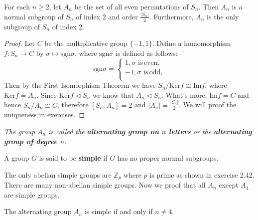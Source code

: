 \begin{theorem}
For each $n\ge 2$, let $A_n$ be the set of all even permutations of $S_n$. Then $A_n$ is a normal subgroup of $S_n$ of index $2$ and order $\frac{|S_n|}{2}$. Furthermore, $A_n$ is the only subgroup of $S_n$ of index $2$.
\end{theorem}
\begin{proof}
Let $C$ be the multiplicative group $\{-1,1\}$. Define a homomorphism $f:S_n\to C$ by $\sigma\mapsto\mathrm{sgn}\sigma$, where $\mathrm{sgn}\sigma$ is defined as follows:
$$
\mathrm{sgn} \sigma =\begin{cases}
	1,\sigma \,\,\mathrm{is}\, \mathrm{even},\\
	-1,\sigma \,\,\mathrm{is}\, \mathrm{odd},\\
\end{cases}
$$
Then by the First Isomorphism Theorem we have $S_n/\mathrm{Ker}f\cong\mathrm{Im}f$, where $\mathrm{Ker}f=A_n$. Since $\mathrm{Ker}f\lhd S_n$ we know that $A_n\lhd S_n$. What's more, $\mathrm{Im}f=C$ and hence $S_n/A_n\cong C$, therefore $[S_n:A_n]=2$ and $|A_n|=\frac{|S_n|}{2}$. We will proof the uniqueness in exercises.
\end{proof}
\begin{note}\em
The group $A_n$ is called the \textbf{alternating group on $n$ letters} or the \textbf{alternating group of degree $n$}.
\end{note}
\begin{definition}
A group $G$ is said to be \textbf{simple} if $G$ has no proper normal subgroups.
\end{definition}
The only abelian simple groups are $\mathbb{Z}_p$ where $p$ is prime as shown in exercise 2.42. There are many non-abelian simple groups. Now we proof that all $A_n$ except $A_4$ are simple groups.
\begin{theorem}
The alternating group $A_n$ is simple if and only if $n\ne 4$.
\end{theorem}
